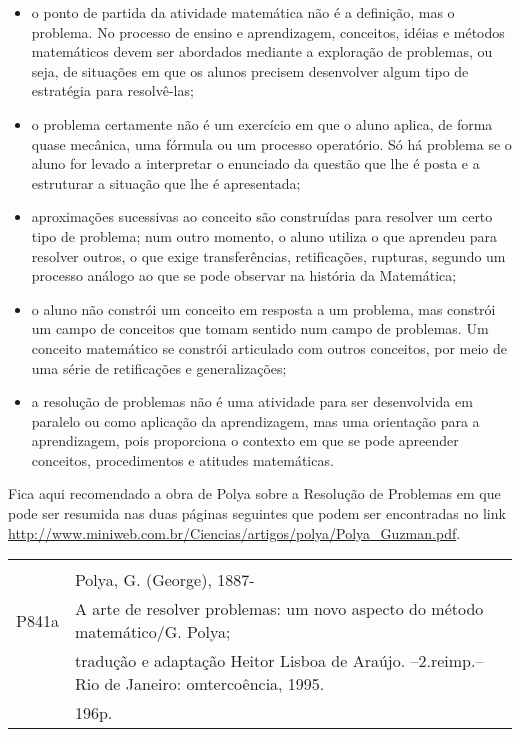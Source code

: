 \begin{itemize}
    \item o ponto de partida da atividade matemática não é a definição, mas o problema. No processo de ensino e aprendizagem, conceitos, idéias e métodos matemáticos devem ser abordados mediante a exploração de problemas, ou seja, de situações em que os alunos precisem desenvolver algum tipo de estratégia para resolvê-las;
    \item o problema certamente não é um exercício em que o aluno aplica, de forma quase mecânica, uma fórmula ou um processo operatório. Só há problema se o aluno for levado a interpretar o enunciado da questão que lhe é posta e a estruturar a situação que lhe é apresentada;
    \item aproximações sucessivas ao conceito são construídas para resolver um certo tipo de problema; num outro momento, o aluno utiliza o que aprendeu para resolver outros, o que exige transferências, retificações, rupturas, segundo um processo análogo ao que se pode observar na história da Matemática;
    \item o aluno não constrói um conceito em resposta a um problema, mas constrói um campo de conceitos que tomam sentido num campo de problemas. Um conceito matemático se constrói articulado com outros conceitos, por meio de uma série de retificações e generalizações;
    \item a resolução de problemas não é uma atividade para ser desenvolvida em paralelo ou como aplicação da aprendizagem, mas uma orientação para a aprendizagem, pois proporciona o contexto em que se pode apreender conceitos, procedimentos e atitudes matemáticas.
\end{itemize}

Fica aqui recomendado a obra de Polya sobre a Resolução de Problemas em \cite{polya1995arte} que pode ser resumida nas duas páginas seguintes que podem ser encontradas no link  \url{http://www.miniweb.com.br/Ciencias/artigos/polya/Polya_Guzman.pdf}.
\thispagestyle{empty}

\begin{footnotesize}
\begin{center}
\begin{tabular}{|cl|} \hline
\hspace{1cm} & \\
& Polya, G. (George), 1887- \\
P841a & \hspace{0.6cm}  A arte de resolver problemas: um novo aspecto do método matemático/G. Polya; \\ &tradução e adaptação Heitor Lisboa de Araújo. --2.reimp.--Rio de Janeiro: omtercoência, 1995.\\
& 196p.\\ \hline
\end{tabular}
\end{center}
\end{footnotesize}%
\hspace*{-1cm}

